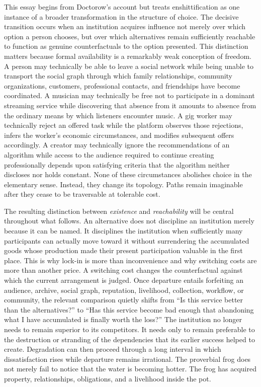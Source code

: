 \documentclass[11pt]{article}
\begin{document}
This essay begins from Doctorow's account but treats enshittification as one instance of a broader transformation in the structure of choice. The decisive transition occurs when an institution acquires influence not merely over which option a person chooses, but over which alternatives remain sufficiently reachable to function as genuine counterfactuals to the option presented. This distinction matters because formal availability is a remarkably weak conception of freedom. A person may technically be able to leave a social network while being unable to transport the social graph through which family relationships, community organizations, customers, professional contacts, and friendships have become coordinated. A musician may technically be free not to participate in a dominant streaming service while discovering that absence from it amounts to absence from the ordinary means by which listeners encounter music. A gig worker may technically reject an offered task while the platform observes those rejections, infers the worker's economic circumstances, and modifies subsequent offers accordingly. A creator may technically ignore the recommendations of an algorithm while access to the audience required to continue creating professionally depends upon satisfying criteria that the algorithm neither discloses nor holds constant. None of these circumstances abolishes choice in the elementary sense. Instead, they change its topology. Paths remain imaginable after they cease to be traversable at tolerable cost.

The resulting distinction between \emph{existence} and \emph{reachability} will be central throughout what follows. An alternative does not discipline an institution merely because it can be named. It disciplines the institution when sufficiently many participants can actually move toward it without surrendering the accumulated goods whose production made their present participation valuable in the first place. This is why lock-in is more than inconvenience and why switching costs are more than another price. A switching cost changes the counterfactual against which the current arrangement is judged. Once departure entails forfeiting an audience, archive, social graph, reputation, livelihood, collection, workflow, or community, the relevant comparison quietly shifts from ``Is this service better than the alternatives?'' to ``Has this service become bad enough that abandoning what I have accumulated is finally worth the loss?'' The institution no longer needs to remain superior to its competitors. It needs only to remain preferable to the destruction or stranding of the dependencies that its earlier success helped to create. Degradation can then proceed through a long interval in which dissatisfaction rises while departure remains irrational. The proverbial frog does not merely fail to notice that the water is becoming hotter. The frog has acquired property, relationships, obligations, and a livelihood inside the pot.
\end{document}

